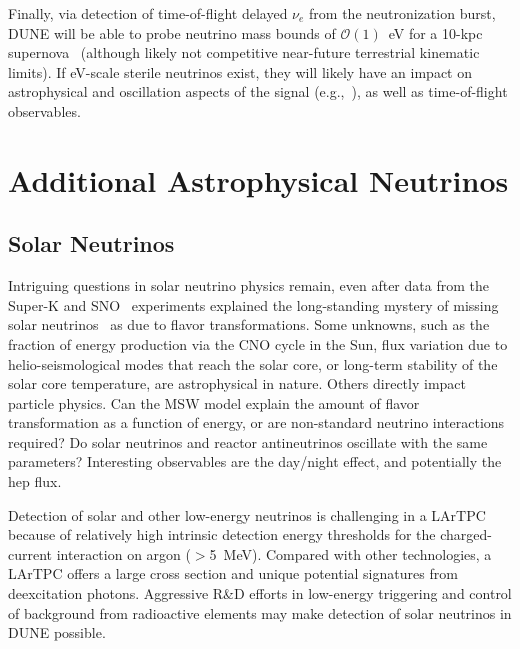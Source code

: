 Finally, via detection of time-of-flight delayed $\nu_e$ from the  neutronization burst,  DUNE will be able to probe neutrino mass bounds of $\mathcal{O}(1)$~eV for a 10-kpc supernova~\cite{Rossi-Torres:2015rla} (although likely not competitive near-future terrestrial kinematic limits).  If eV-scale sterile neutrinos exist, they will likely have an impact on astrophysical and oscillation aspects of the signal (e.g.,~\cite{Keranen:2007ga,Tamborra:2011is,Esmaili:2014gya}), as well as time-of-flight observables. \\





\section{Additional Astrophysical Neutrinos}
\label{sec:physics-snblowe-other}

\subsection{Solar Neutrinos}

Intriguing questions in solar neutrino physics remain,
even after data
from the Super-K and SNO~\cite{Fukuda:2001nj,Ahmad:2001an}
experiments explained the long-standing mystery of missing solar
neutrinos~\cite{Cleveland:1998nv} as due to flavor
transformations. 
Some unknowns, such as the fraction of energy production via the CNO
cycle in the Sun, flux variation due to helio-seismological modes that
reach the solar core, or long-term stability of the solar core
temperature, are astrophysical in nature. Others directly impact
particle physics. Can the MSW model explain the amount of flavor
transformation as a function of energy, or are non-standard neutrino
interactions required?  Do solar neutrinos and reactor antineutrinos
oscillate with the same parameters?   Interesting observables are the
day/night effect, and potentially the hep flux.

Detection of solar and other low-energy neutrinos is challenging in
a LArTPC because of relatively high intrinsic detection energy thresholds for
the charged-current interaction on argon ($>$\SI{5}{\MeV}). 
Compared with other technologies, a LArTPC offers a large
cross section and unique potential signatures from deexcitation
photons. Aggressive R\&D efforts in low-energy triggering and
control of background from radioactive elements may make detection
of solar neutrinos in DUNE possible.

